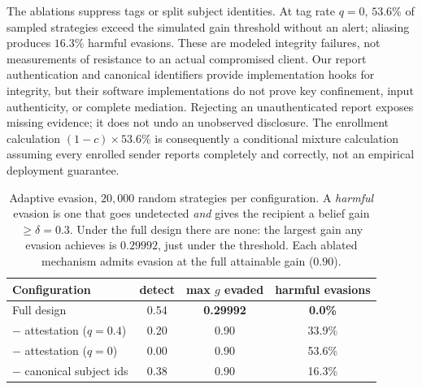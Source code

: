 The ablations suppress tags or split subject identities. At tag rate $q=0$,
$53.6\%$ of sampled strategies exceed the simulated gain threshold without an
alert; aliasing produces $16.3\%$ harmful evasions. These are modeled integrity
failures, not measurements of resistance to an actual compromised client.
Our report authentication and canonical identifiers provide implementation
hooks for integrity, but their software implementations do not prove key
confinement, input authenticity, or complete mediation. Rejecting an unauthenticated
report exposes missing evidence; it does not undo an unobserved disclosure.
The enrollment calculation $(1-c)\times53.6\%$ is consequently a conditional
mixture calculation assuming every enrolled sender reports completely and
correctly, not an empirical deployment guarantee.

\begin{table}[t]\centering\small
\begin{tabular}{lccc}
\toprule
Configuration & detect & max $g$ evaded & harmful evasions \\
\midrule
Full design & 0.54 & \textbf{0.29992} & \textbf{0.0\%} \\
$-$ attestation ($q{=}0.4$) & 0.20 & 0.90 & 33.9\% \\
$-$ attestation ($q{=}0$) & 0.00 & 0.90 & 53.6\% \\
$-$ canonical subject ids & 0.38 & 0.90 & 16.3\% \\
\bottomrule
\end{tabular}
\caption{Adaptive evasion, $20{,}000$ random strategies per configuration. A
\emph{harmful} evasion is one that goes undetected \emph{and} gives the recipient
a belief gain $\geq\delta{=}0.3$. Under the full design there are none: the
largest gain any evasion achieves is $0.29992$, just under the threshold. Each
ablated mechanism admits evasion at the full attainable gain ($0.90$).}
\label{tab:evasion}
\end{table}

